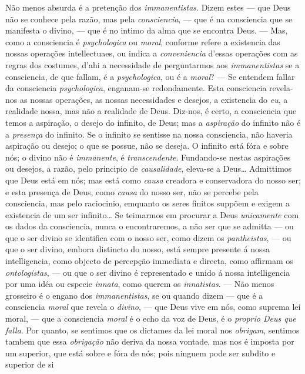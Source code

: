 {Não menos absurda é a pretenção dos \emph{immanentistas}. Dizem estes --- que Deus não
se conhece pela razão, mas pela \emph{consciencia}, --- que é na consciencia que se
manifesta o divino, --- que é no intimo da alma que se encontra Deus. --- Mas, como a
consciencia é \emph{psychologica} ou \emph{moral}, conforme refere a existencia das
nossas operações intellectuaes, ou indica a \emph{conveniencia} d'essas operações com
as regras dos costumes, d'ahi a necessidade de perguntarmos aos \emph{immanentistas} se
a consciencia, de que fallam, é a \emph{psychologica}, ou é a \emph{moral}? --- Se
entendem fallar da consciencia \emph{psychologica}, enganam-se redondamente. Esta
consciencia revela-nos as nossas operações, as nossas necessidades e desejos, a
existencia do \emph{eu}, a realidade nossa, mas não a realidade de Deus. Diz-nos, é
certo, a consciencia que temos a aspiração, o desejo do infinito, de Deus; mas a
\emph{aspiração} do infinito não é a \emph{presença} do infinito. Se o infinito se
sentisse na nossa consciencia, não haveria aspiração ou desejo; o que se possue, não se
deseja. O infinito está fóra e sobre nós; o divino não é \emph{immanente}, é
\emph{transcendente}. Fundando-se nestas aspirações ou desejos, a razão, pelo principio
de \emph{causalidade}, eleva-se a Deus\dots{} Admittimos que Deus está em nós; mas está
como \emph{causa} creadora e conservadora do nosso ser; e esta presença de Deus, como
\emph{causa} do nosso ser, não se percebe pela consciencia, mas pelo raciocinio,
emquanto os seres finitos suppõem e exigem a existencia de um ser infinito\dots{} Se
teimarmos em procurar a Deus \emph{unicamente} com os dados da consciencia, nunca o
encontraremos, a não ser que se admitta --- ou que o ser divino se identifica com o
nosso ser, como dizem os \emph{pantheistas}, --- ou que o ser divino, embora distincto
do nosso, está sempre presente á nossa intelligencia, como objecto de percepção
immediata e directa, como affirmam os \emph{ontologistas}, --- ou que o ser divino é
representado e unido á nossa intelligencia por uma idéa ou especie \emph{innata}, como
querem os \emph{innatistas}. --- Não menos grosseiro é o engano dos
\emph{immanentistas}, se ou quando dizem --- que é a consciencia \emph{moral} que
revela o \emph{divino}, --- que Deus vive em nós, como suprema lei moral, --- que a
consciencia \emph{moral} é o echo da voz de Deus, é o \emph{proprio Deus que falla}.
Por quanto, se sentimos que os dictames da lei moral nos \emph{obrigam}, sentimos
tambem que essa \emph{obrigação} não deriva da nossa vontade, mas nos é imposta por um
superior, que está sobre e fóra de nós; pois ninguem pode ser subdito e superior de si
}
